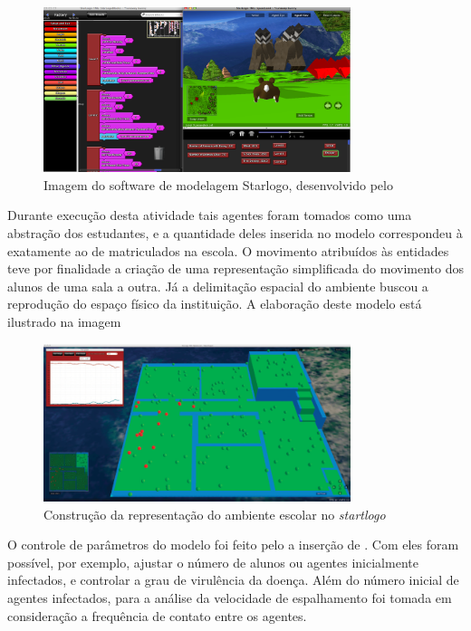 \begin{figure}[!htb]
  \caption{Imagem do software de modelagem Starlogo, desenvolvido pelo }
  \begin{center}
    \includegraphics[width=0.8\textwidth]{imagens/starlogo}
  \end{center}
  \label{fig:starlogo}
\end{figure}

Durante execução desta atividade tais agentes foram tomados como uma abstração dos estudantes, e a quantidade deles inserida no modelo correspondeu à exatamente ao de matriculados na escola. O movimento atribuídos às entidades teve por finalidade a criação de uma representação simplificada do movimento dos alunos de uma sala a outra. Já a delimitação espacial do ambiente buscou a reprodução do espaço físico da instituição. A elaboração deste modelo está ilustrado na imagem

\begin{figure}[!htb]
  \caption{Construção da representação do ambiente escolar no \textit{startlogo}}
  \begin{center}
    \includegraphics[width=0.8\textwidth]{imagens/layout-starlogo}
  \end{center}
  \label{fig:starlogo}
\end{figure}

O controle de parâmetros do modelo foi feito pelo a inserção de . Com eles foram possível, por exemplo, ajustar o número de alunos ou agentes inicialmente infectados, e controlar a grau de virulência da doença. Além do número inicial de agentes infectados, para a análise da velocidade de espalhamento foi tomada em consideração a frequência de contato entre os agentes. 

